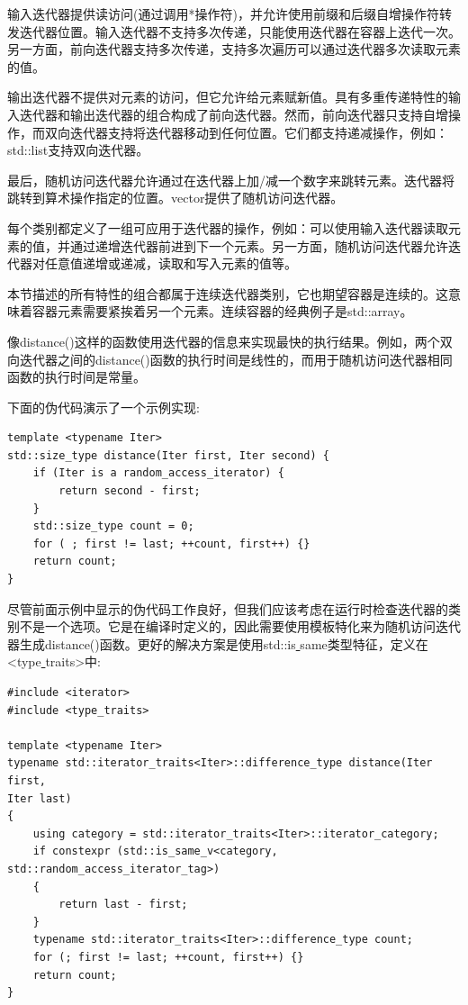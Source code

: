 输入迭代器提供读访问(通过调用*操作符)，并允许使用前缀和后缀自增操作符转发迭代器位置。输入迭代器不支持多次传递，只能使用迭代器在容器上迭代一次。另一方面，前向迭代器支持多次传递，支持多次遍历可以通过迭代器多次读取元素的值。 \par
输出迭代器不提供对元素的访问，但它允许给元素赋新值。具有多重传递特性的输入迭代器和输出迭代器的组合构成了前向迭代器。然而，前向迭代器只支持自增操作，而双向迭代器支持将迭代器移动到任何位置。它们都支持递减操作，例如：std::list支持双向迭代器。 \par
最后，随机访问迭代器允许通过在迭代器上加/减一个数字来跳转元素。迭代器将跳转到算术操作指定的位置。vector提供了随机访问迭代器。 \par
每个类别都定义了一组可应用于迭代器的操作，例如：可以使用输入迭代器读取元素的值，并通过递增迭代器前进到下一个元素。另一方面，随机访问迭代器允许迭代器对任意值递增或递减，读取和写入元素的值等。 \par
本节描述的所有特性的组合都属于连续迭代器类别，它也期望容器是连续的。这意味着容器元素需要紧挨着另一个元素。连续容器的经典例子是std::array。 \par
像distance()这样的函数使用迭代器的信息来实现最快的执行结果。例如，两个双向迭代器之间的distance()函数的执行时间是线性的，而用于随机访问迭代器相同函数的执行时间是常量。 \par
下面的伪代码演示了一个示例实现: \par

\begin{lstlisting}[caption={}]
template <typename Iter>
std::size_type distance(Iter first, Iter second) {
	if (Iter is a random_access_iterator) {
		return second - first;
	}
	std::size_type count = 0;
	for ( ; first != last; ++count, first++) {}
	return count;
}
\end{lstlisting}

尽管前面示例中显示的伪代码工作良好，但我们应该考虑在运行时检查迭代器的类别不是一个选项。它是在编译时定义的，因此需要使用模板特化来为随机访问迭代器生成distance()函数。更好的解决方案是使用std::is\underline{ }same类型特征，定义在<type\underline{ }traits>中: \par

\begin{lstlisting}[caption={}]
#include <iterator>
#include <type_traits>

template <typename Iter>
typename std::iterator_traits<Iter>::difference_type distance(Iter first,
Iter last)
{
	using category = std::iterator_traits<Iter>::iterator_category;
	if constexpr (std::is_same_v<category, std::random_access_iterator_tag>)
	{
		return last - first;
	}
	typename std::iterator_traits<Iter>::difference_type count;
	for (; first != last; ++count, first++) {}
	return count;
}
\end{lstlisting}

